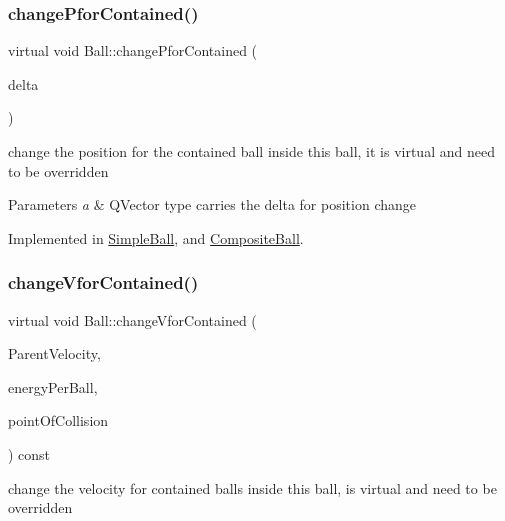 \subsubsection{\texorpdfstring{change\+Pfor\+Contained()}{changePforContained()}}
{\footnotesize\ttfamily virtual void Ball\+::change\+Pfor\+Contained (\begin{DoxyParamCaption}\item[{const Q\+Vector2D \&}]{delta }\end{DoxyParamCaption})\hspace{0.3cm}{\ttfamily [pure virtual]}}



change the position for the contained ball inside this ball, it is virtual and need to be overridden 


\begin{DoxyParams}{Parameters}
{\em a} & Q\+Vector type carries the delta for position change \\
\hline
\end{DoxyParams}


Implemented in \mbox{\hyperlink{class_simple_ball_a22ec99de5d096383f869a919f9f9abd7}{Simple\+Ball}}, and \mbox{\hyperlink{class_composite_ball_a1e559c1b9d9b4905599c370c79990576}{Composite\+Ball}}.

\mbox{\label{class_ball_a43cfbf4dca89a94048b4d45b2eaf62e9}} 
\subsubsection{\texorpdfstring{change\+Vfor\+Contained()}{changeVforContained()}}
{\footnotesize\ttfamily virtual void Ball\+::change\+Vfor\+Contained (\begin{DoxyParamCaption}\item[{const Q\+Vector2D \&}]{Parent\+Velocity,  }\item[{float}]{energy\+Per\+Ball,  }\item[{const Q\+Vector2D \&}]{point\+Of\+Collision }\end{DoxyParamCaption}) const\hspace{0.3cm}{\ttfamily [pure virtual]}}



change the velocity for contained balls inside this ball, is virtual and need to be overridden 


